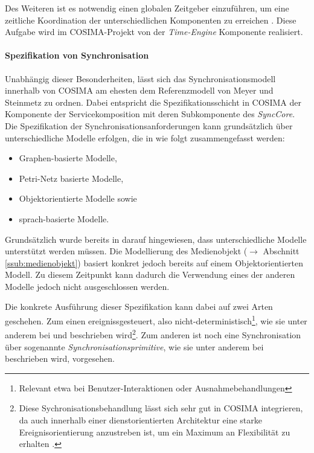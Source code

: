   Des Weiteren ist es notwendig einen globalen Zeitgeber einzuführen, um eine zeitliche Koordination der unterschiedlichen Komponenten zu erreichen \citep[S. 610]{multimedia_technologie}. Diese Aufgabe wird im COSIMA-Projekt von der \emph{Time-Engine} Komponente realisiert.


\paragraph{Spezifikation von Synchronisation} %
\label{par:spezifikation_von_synchronisation}

  Unabhängig dieser Besonderheiten, lässt sich das Synchronisationsmodell innerhalb von COSIMA am ehesten dem Referenzmodell von Meyer und Steinmetz zu ordnen. Dabei entspricht die Spezifikationsschicht in COSIMA der Komponente der Servicekomposition mit deren Subkomponente des \emph{SyncCore}. Die Spezifikation der Synchronisationsanforderungen kann grundsätzlich über unterschiedliche Modelle erfolgen, die in \citep[S. 617]{bertino1998tsm} wie folgt zusammengefasst werden:
  
  \begin{itemize}
    \item Graphen-basierte Modelle, 
    \item Petri-Netz basierte Modelle, 
    \item Objektorientierte Modelle sowie 
    \item sprach-basierte Modelle.
  \end{itemize}
  
  Grundsätzlich wurde bereits in \citep[S. 34]{bericht} darauf hingewiesen, dass unterschiedliche Modelle unterstützt werden müssen. Die Modellierung des Medienobjekt ($\to$ Abschnitt \ref{ssub:medienobjekt}) basiert konkret jedoch bereits auf einem Objektorientierten Modell. Zu diesem Zeitpunkt kann dadurch die Verwendung eines der anderen Modelle jedoch nicht ausgeschlossen werden.

  Die konkrete Ausführung dieser Spezifikation kann dabei auf zwei Arten geschehen. Zum einen ereignissgesteuert, also nicht-deterministisch\footnote{Relevant etwa bei Benutzer-Interaktionen oder Ausnahmebehandlungen}, wie sie unter anderem bei \citep{little1991ms} und \citep{bertino1998tsm} beschrieben wird\footnote{Diese Sychronisationsbehandlung lässt sich sehr gut in COSIMA integrieren, da auch innerhalb einer dienstorientierten Architektur eine starke Ereignisorientierung anzustreben ist, um ein Maximum an Flexibilität zu erhalten \citep[S. 96]{masak2007ssb}.}. Zum anderen ist noch eine Synchronisation über sogenannte \emph{Synchronisationsprimitive}, wie sie unter anderem bei \citep{gaggi2005msh} beschrieben wird, vorgesehen.
  

